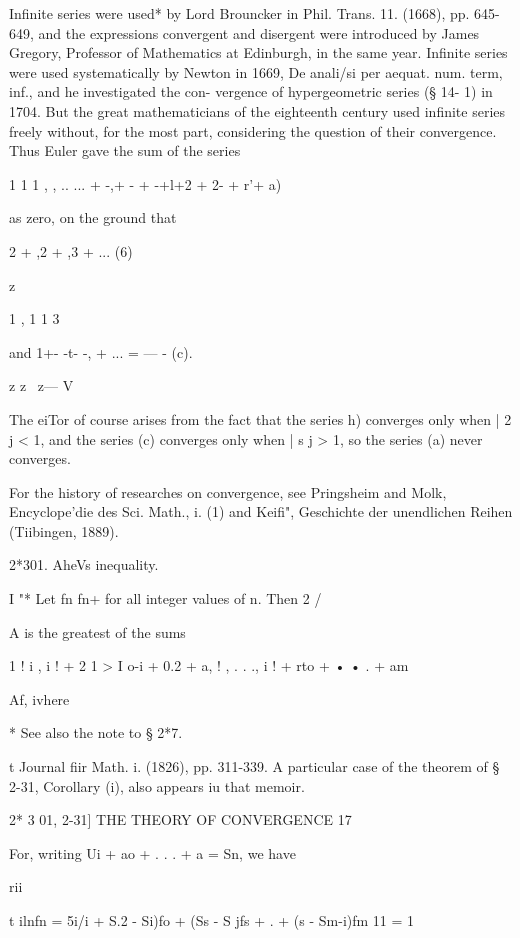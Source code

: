 Infinite series were used* by Lord Brouncker in Phil. Trans. 11. (1668), pp. 645-649, 
and the expressions convergent and disergent were introduced by James Gregory, Professor 
of Mathematics at Edinburgh, in the same year. Infinite series were used systematically 
by Newton in 1669, De anali/si per aequat. num. term, inf., and he investigated the con- 
vergence of hypergeometric series (§ 14- 1) in 1704. But the great mathematicians of the 
eighteenth century used infinite series freely without, for the most part, considering the 
question of their convergence. Thus Euler gave the sum of the series 

1 1 1 , , .. 
... + -,+ -  + -+l+2 + 2- + r'+  a) 

as zero, on the ground that 

2 + ,2 + ,3 + ...  (6) 

\-z 

1 , 1 1 3 

and 1+- -t- -, + ... = — - (c). 

z z~ z— V 

The eiTor of course arises from the fact that the series  h) converges only when | 2 j < 1, 
and the series (c) converges only when | s j > 1, so the series (a) never converges. 

For the history of researches on convergence, see Pringsheim and Molk, Encyclope'die 
des Sci. Math., i. (1) and Keifi", Geschichte der unendlichen Reihen (Tiibingen, 1889). 



2*301. AheVs inequality.  

I "* 
Let fn fn+   for all integer values of n. Then 2   /  

A is the greatest of the sums 

1  ! i , i  ! +  2 1 > I o-i + 0.2 + a, ! , . . ., i  ! + rto + • • . + am 



  Af, ivhere 



* See also the note to § 2*7. 

t Journal fiir Math. i. (1826), pp. 311-339. A particular case of the theorem of § 2-31, 
Corollary (i), also appears iu that memoir. 



2* 3 01, 2-31] THE THEORY OF CONVERGENCE 17 

For, writing Ui + ao + . . . + a  = Sn, we have 

rii 

t ilnfn = 5i/i +  S.2 - Si)fo + (Ss - S jfs + .  + (s  - Sm-i)fm 
11 = 1 

